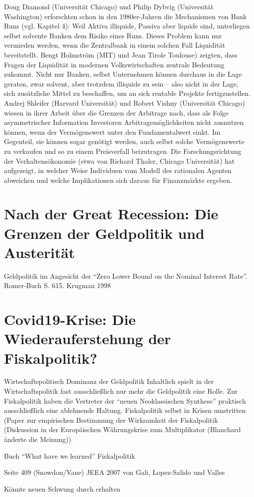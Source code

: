 Doug
Diamond (Universität Chicago) und Philip Dybvig (Universität Washington) erforschten
schon in den 1980er-Jahren die Mechanismen von Bank Runs (vgl. Kapitel 4): Weil
Aktiva illiquide, Passiva aber liquide sind, unterliegen selbst solvente Banken dem
Risiko eines Runs. Dieses Problem kann nur vermieden werden, wenn die Zentralbank
in einem solchen Fall Liquidität bereitstellt. Bengt Holmström (MIT) und Jean Tirole
Toulouse) zeigten, dass Fragen der Liquidität in modernen Volkswirtschaften zentrale
Bedeutung zukommt. Nicht nur Banken, selbst Unternehmen können durchaus in die
Lage geraten, zwar solvent, aber trotzdem illiquide zu sein – also nicht in der Lage, sich
zusätzliche Mittel zu beschaffen, um an sich rentable Projekte fertigzustellen. Andrej
Shleifer (Harvard Universität) und Robert Vishny (Universität Chicago) wiesen in ihrer
Arbeit über die Grenzen der Arbitrage nach, dass als Folge asymmetrischer Information
Investoren Arbitragemöglichkeiten nicht ausnutzen können, wenn der Vermögenswert
unter den Fundamentalwert sinkt. Im Gegenteil, sie können sogar genötigt werden, auch
selbst solche Vermögenswerte zu verkaufen und so zu einem Preisverfall beizutragen.
Die Forschungsrichtung der Verhaltensökonomie (etwa von Richard Thaler, Chicago
Universität) hat aufgezeigt, in welcher Weise Individuen vom Modell des rationalen
Agenten abweichen und welche Implikationen sich daraus für Finanzmärkte ergeben.





\section{Nach der Great Recession: Die Grenzen der Geldpolitik und Austerität}

Geldpolitik im Angesicht der "`Zero Lower Bound on the Nominal Interest Rate"'. Romer-Buch S. 615.
Krugman 1998


\section{Covid19-Krise: Die Wiederauferstehung der Fiskalpolitik?}
\label{NeueFiskal}



Wirtschaftspolitisch Dominanz der Geldpolitik
Inhaltlich spielt in der Wirtschaftspolitik fast ausschließlich nur mehr die Geldpolitik eine Rolle. Zur Fiskalpolitik haben die Vertreter der "`neuen Neoklassischen Synthese"' praktisch ausschließlich eine ablehnende Haltung.
Fiskalpolitik selbst in Krisen umstritten (Paper zur empirischen Bestimmung der Wirksamkeit der Fiskalpolitik (Diskussion in der Europäischen Währungskrise zum Multiplikator (Blanchard änderte die Meinung))

\textcite[S. 130]{Christiano2018}



Buch "`What have we learned"'
Fiskalpolitik \textcite[S. 131]{Christiano2018}


Seite 409 (Snowdon/Vane)
\parencite{Woodford2011}
JEEA 2007 von Gali, Lopez-Salido und Valles 

Könnte neuen Schwung durch \textcite{Kaplan2018} erhalten



















